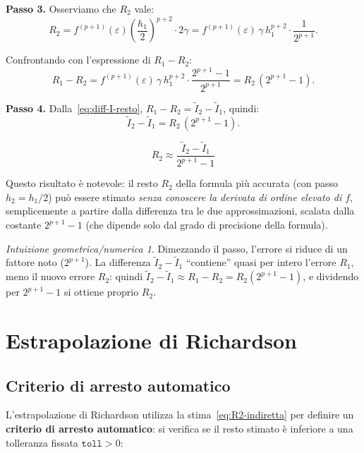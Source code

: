 \documentclass[a4paper,12pt]{article}
\theoremstyle{definition}
\theoremstyle{remark}
\newtheorem*{intuizione}{Intuizione geometrica/numerica}
\begin{document}
\noindent\textbf{Passo 3.} Osserviamo che $R_2$ vale:
\[
  R_2 = f^{(p+1)}(\varepsilon)\!\left(\frac{h_1}{2}\right)^{\!p+2}\!\cdot 2\gamma
      = f^{(p+1)}(\varepsilon)\,\gamma\,h_1^{p+2}\cdot\frac{1}{2^{p+1}}.
\]

Confrontando con l'espressione di $R_1 - R_2$:
\[
  R_1 - R_2 = f^{(p+1)}(\varepsilon)\,\gamma\,h_1^{p+2}\cdot
  \frac{2^{p+1}-1}{2^{p+1}} = R_2\,(2^{p+1}-1).
\]

\noindent\textbf{Passo 4.} Dalla~\eqref{eq:diff-I-resto},
$R_1 - R_2 = \tilde{I}_2 - \tilde{I}_1$, quindi:
\[
  \tilde{I}_2 - \tilde{I}_1 = R_2\,(2^{p+1}-1).
\]

\begin{equation}
  \boxed{R_2 \approx \frac{\tilde{I}_2 - \tilde{I}_1}{2^{p+1}-1}}
  \label{eq:R2-indiretta}
\end{equation}

\noindent Questo risultato è notevole: il resto $R_2$ della formula più
accurata (con passo $h_2 = h_1/2$) può essere stimato \emph{senza conoscere
la derivata di ordine elevato di $f$}, semplicemente a partire dalla
differenza tra le due approssimazioni, scalata dalla costante
$2^{p+1}-1$ (che dipende solo dal grado di precisione della formula).

\begin{intuizione}
Dimezzando il passo, l'errore si riduce di un fattore noto ($2^{p+1}$).
La differenza $\tilde{I}_2 - \tilde{I}_1$ ``contiene'' quasi per intero
l'errore $R_1$, meno il nuovo errore $R_2$: quindi $\tilde{I}_2 - \tilde{I}_1
\approx R_1 - R_2 = R_2(2^{p+1}-1)$, e dividendo per $2^{p+1}-1$ si ottiene
proprio $R_2$.
\end{intuizione}

\section{Estrapolazione di Richardson}

\subsection{Criterio di arresto automatico}

L'estrapolazione di Richardson utilizza la stima~\eqref{eq:R2-indiretta}
per definire un \textbf{criterio di arresto automatico}: si verifica se il
resto stimato è inferiore a una tolleranza fissata $\mathtt{toll} > 0$:
\end{document}
